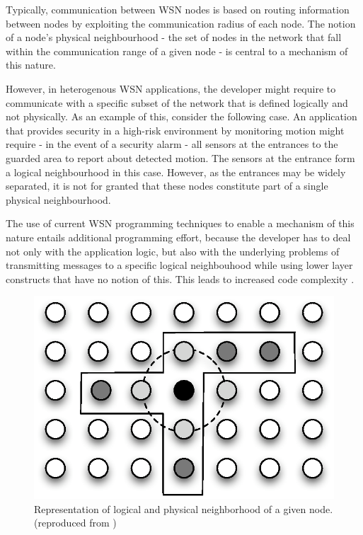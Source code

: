 Typically, communication between WSN nodes is based on routing 
information between nodes by exploiting the communication radius of each node.
The notion of a node's physical neighbourhood - the set of nodes in the
network that fall within the communication range of a given node - is central to a mechanism of this nature.

However, in heterogenous WSN applications, the developer might require to
communicate with a specific subset of the network that is defined logically and
not physically. As an example of this, consider the following case. An
application that provides security in a high-risk environment by monitoring 
motion might require - in the event of a security alarm - all sensors at the
entrances to the guarded area to report about detected motion.
The sensors at the entrance form a logical neighbourhood in this case. However,
as the entrances may be widely separated, it is not for granted that these nodes
constitute part of a single physical neighbourhood.

The use of current WSN programming techniques to enable a mechanism of this
nature entails additional programming effort, because the developer has to deal
not only with the application logic, but also with the underlying problems of
transmitting messages to a specific logical neighbouhood while using lower layer
constructs that have no notion of this. This leads to increased code complexity
\cite{mottola_LN:2006}.

\begin{figure} 
\centering
\includegraphics[scale=0.71]{img/LN_physical_vs_logical.eps} 
\caption[Difference between physical and logical neighborhoods]{Representation 
of logical and physical neighborhood of a given node. (reproduced from
\cite{mottola_LN:2006})}
\label{Fig:LN_physical_vs_logical}
\end{figure} 

